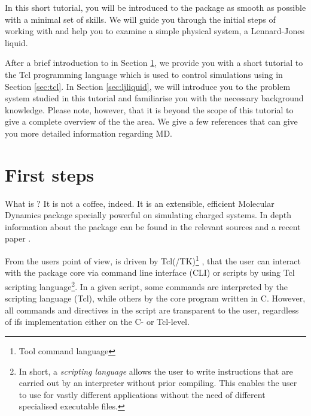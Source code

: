 \documentclass[
paper=a4,                       %
fontsize=11pt,                  %
twoside,                        %
footsepline,                    %
headsepline,                    %
headinclude=false,              %
footinclude=false,              %
pagesize,                       %
]{scrartcl}
\begin{document}
In this short tutorial, you will be introduced to the \es{} package as smooth 
as possible with a minimal set of skills. We will guide you through the initial 
steps of working with \es{} and help you to examine a simple physical system, a 
Lennard-Jones liquid.

After a brief introduction to \es{} in Section \ref{sec:espresso}, we provide 
you with a short tutorial to the Tcl programming language which is used to 
control simulations using \es{} in Section \ref{sec:tcl}. In Section \ref{sec:ljliquid}, we will 
introduce you to the problem system studied in this tutorial and familiarise you with the necessary 
background knowledge. Please note, however, that it is beyond the scope of this 
tutorial to give a complete overview of the the area. We give a few 
references that can give you more detailed information regarding MD.



\section{First steps}\label{sec:espresso}

  What is \es{}? It is not a coffee, indeed. It is an extensible, efficient 
  Molecular Dynamics package specially powerful on simulating charged systems. 
  In depth information about the package can be found in the relevant sources 
  \cite{esp_url,arnold2003ees} and a recent paper \cite{limbach2006ees}.

  From the users point of view, \es{} is driven by Tcl(/TK)\footnote{Tool
  command language} \cite{tcl_url}, that the
  user can interact with the package core via command line interface (CLI) or 
  scripts by using Tcl scripting language\footnote{In short, a \emph{scripting language
  } allows the user to write instructions that are carried out by an interpreter
  without prior compiling. This enables the user to use \es{} for vastly
  different applications without the need of different specialised executable files.}.
  In a given \es{} script, some commands
  are interpreted by the scripting language (Tcl), while others by the core
  \es{} program written in C. However, all \es{} commands and directives in the
  script are
  transparent to the user, regardless of ifs implementation either on the C- or Tcl-level.
\end{document}
